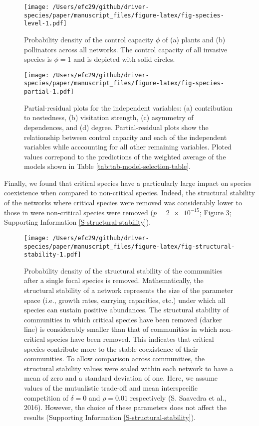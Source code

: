 \documentclass[a4paper]{artikel1}
\theoremstyle{definition}
\theoremstyle{definition}
\theoremstyle{definition}
\theoremstyle{remark}
\begin{document}
\begin{figure}
\centering
\texttt{[image: /Users/efc29/github/driver-species/paper/manuscript\_files/figure-latex/fig-species-level-1.pdf]}
\caption{\label{fig:fig-species-level}Probability density of the control
capacity \(\phi\) of (a) plants and (b) pollinators across all networks.
The control capacity of all invasive species is \(\phi = 1\) and is
depicted with solid circles.}
\end{figure}

\begin{figure}
\centering
\texttt{[image: /Users/efc29/github/driver-species/paper/manuscript\_files/figure-latex/fig-species-partial-1.pdf]}
\caption{\label{fig:fig-species-partial}Partial-residual plots for the
independent variables: (a) contribution to nestedness, (b) visitation
strength, (c) asymmetry of dependences, and (d) degree. Partial-residual
plots show the relationship between control capacity and each of the
independent variables while acccounting for all other remaining
variables. Ploted values correpond to the predictions of the weighted
average of the models shown in Table
\ref{tab:tab-model-selection-table}.}
\end{figure}

Finally, we found that critical species have a particularly large impact
on species coexistence when compared to non-critical species. Indeed,
the structural stability of the networks where critical species were
removed was considerably lower to those in were non-critical species
were removed (\(p = \num{2e-15}\); Figure
\ref{fig:fig-structural-stability}; Supporting Information
\ref{S-structural-stability}).

\begin{figure}
\centering
\texttt{[image: /Users/efc29/github/driver-species/paper/manuscript\_files/figure-latex/fig-structural-stability-1.pdf]}
\caption{\label{fig:fig-structural-stability}Probability density of the
structural stability of the communities after a single focal species is
removed. Mathematically, the structural stability of a network
represents the size of the parameter space (i.e., growth rates, carrying
capacities, etc.) under which all species can sustain positive
abundances. The structural stability of communities in which critical
species have been removed (darker line) is considerably smaller than
that of communities in which non-critical species have been removed.
This indicates that critical species contribute more to the stable
coexistence of their communities. To allow comparison across
communities, the structural stability values were scaled within each
network to have a mean of zero and a standard deviation of one. Here, we
assume values of the mutualistic trade-off and mean interspecific
competition of \(\delta = 0\) and \(\rho = 0.01\) respectively (S.
Saavedra et al., 2016). However, the choice of these parameters does not
affect the results (Supporting Information
\ref{S-structural-stability}).}
\end{figure}
\end{document}
